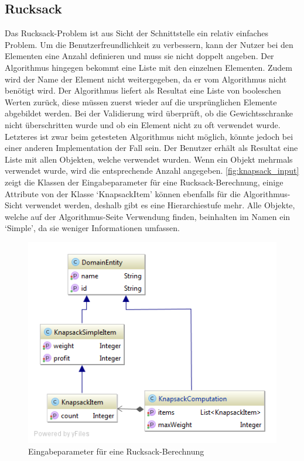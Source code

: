 \subsection{Rucksack}
Das Rucksack-Problem ist aus Sicht der Schnittstelle ein relativ einfaches Problem. Um die Benutzerfreundlichkeit zu verbessern, kann der Nutzer bei den Elementen eine Anzahl definieren und 
muss sie nicht doppelt angeben. Der Algorithmus hingegen bekommt eine Liste mit den einzelnen Elementen. Zudem wird der Name der Element nicht weitergegeben, da er vom 
Algorithmus nicht benötigt wird. Der Algorithmus liefert als Resultat eine Liste von booleschen Werten zurück, diese müssen zuerst wieder auf die ursprünglichen Elemente abgebildet werden. Bei 
der Validierung wird überprüft, ob die Gewichtsschranke nicht überschritten wurde und ob ein Element nicht zu oft verwendet wurde. Letzteres ist zwar beim getesteten Algorithmus nicht 
möglich, könnte jedoch bei einer anderen Implementation der Fall sein. Der Benutzer erhält als Resultat eine Liste mit allen Objekten, welche verwendet wurden. Wenn ein Objekt mehrmals 
verwendet wurde, wird die entsprechende Anzahl angegeben. \autoref{fig:knapsack_input} zeigt die Klassen der Eingabeparameter für eine Rucksack-Berechnung, einige Attribute von der 
Klasse `KnapsackItem' können ebenfalls für die Algorithmus-Sicht verwendet werden, deshalb gibt es eine Hierarchiestufe mehr. Alle Objekte, welche auf der Algorithmus-Seite Verwendung
finden, beinhalten im Namen ein `Simple', da sie weniger Informationen umfassen.

\begin{figure}[h]
\centering
\includegraphics[scale=0.5]{images/probleme/knapsack.png}
\caption[Eingabeparameter für eine Rucksack-Berechnung]{Eingabeparameter für eine Rucksack-Berechnung \selfmade{}}
\label{fig:knapsack_input}
\end{figure}

